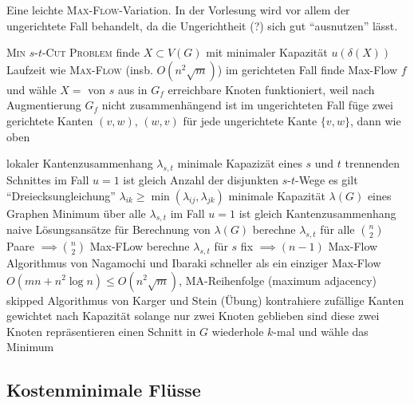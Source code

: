 \begin{outline}
\0 Eine leichte  \textsc{Max-Flow}-Variation. In der Vorlesung wird vor allem der ungerichtete Fall behandelt, da die Ungerichtheit (?) sich gut \enquote{ausnutzen} lässt.

    \1 \textsc{Min $s$-$t$-Cut Problem}
        \2 finde $X\subset V(G)$ mit minimaler Kapazität $u(\delta(X))$  
        \2 Laufzeit wie \textsc{Max-Flow} (insb. $O(n^2\sqrt{m})$)
            \3 im gerichteten Fall finde Max-Flow $f$ und wähle $X =$ von $s$ aus in $G_f$ erreichbare Knoten 
                \4 funktioniert, weil nach Augmentierung $G_f$ nicht zusammenhängend ist
            \3 im ungerichteten Fall füge zwei gerichtete Kanten $(v,w)$, $(w,v)$ für jede ungerichtete Kante $\{v,w\}$, dann wie oben

    \1 lokaler Kantenzusammenhang $\lambda_{s,t}$
        \2 minimale Kapazizät eines $s$ und $t$ trennenden Schnittes 
        \2 im Fall $u=1$ ist gleich Anzahl der disjunkten $s$-$t$-Wege 
        \2 es gilt \enquote{Dreiecksungleichung} $\lambda_{ik} \geq \min (\lambda_{ij},\lambda_{jk})$
    \1 minimale Kapazität $\lambda(G)$ eines Graphen
        \2 Minimum über alle $\lambda_{s,t}$
        \2 im Fall $u=1$ ist gleich Kantenzusammenhang
    \1 naive Lösungsansätze für Berechnung von $\lambda(G)$
        \2 berechne $\lambda_{s,t}$ für alle $\binom{n}{2}$ Paare $\implies \binom{n}{2}$ Max-FLow  
        \2 berechne $\lambda_{s,t}$ für $s$ fix $\implies (n-1)$ Max-Flow
    \1 Algorithmus von Nagamochi und Ibaraki
        \2 schneller als ein einziger Max-Flow $O(mn+n^2\log n)\leq O(n^2\sqrt{m})$, 
        \2 MA-Reihenfolge (maximum adjacency)
            \3 skipped
    \1 Algorithmus von Karger und Stein (Übung)
            \2 kontrahiere zufällige Kanten gewichtet nach Kapazität solange nur zwei Knoten geblieben sind
            \2 diese zwei Knoten repräsentieren einen Schnitt in $G$
            \2 wiederhole $k$-mal und wähle das Minimum
\end{outline}

\subsection{Kostenminimale Flüsse}


